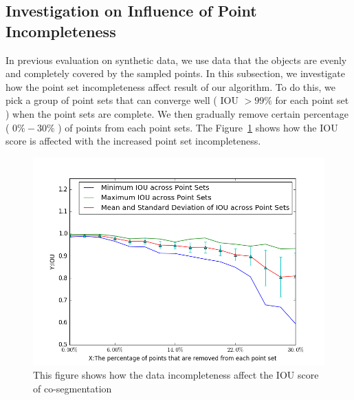 \subsection{Investigation on Influence of Point Incompleteness}
In previous evaluation on synthetic data, we use data that the objects are evenly and completely covered by the sampled points. In this subsection, we investigate how the point set incompleteness affect result of our algorithm. To do this, we pick a group of point sets that can converge well ( IOU $> 99\%$ for each point set ) when the point sets are complete. We then gradually remove certain percentage ( $0\%-30\%$ ) of points from each point sets. The Figure~\ref{fig:incompleteness} shows how the IOU score is affected with the increased point set incompleteness.
\begin{figure}[htb]
	\centering
	\includegraphics[width=\linewidth]{images/incompleteness/IOU.png}
	\caption{This figure shows how the data incompleteness affect the IOU score of co-segmentation}
	\label{fig:incompleteness}
\end{figure}
